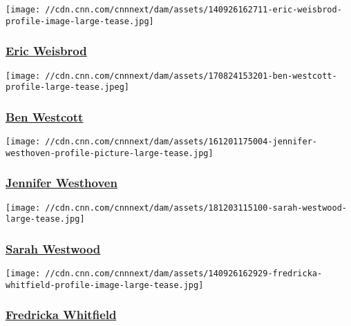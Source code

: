 \href{/profiles/eric-weisbrod-profile}{}

\texttt{[image: //cdn.cnn.com/cnnnext/dam/assets/140926162711-eric-weisbrod-profile-image-large-tease.jpg]}

\hypertarget{eric-weisbrod}{%
\subsubsection{\texorpdfstring{\href{/profiles/eric-weisbrod-profile}{Eric
Weisbrod}}{Eric Weisbrod}}\label{eric-weisbrod}}

\href{/profiles/ben-westcott}{}

\texttt{[image: //cdn.cnn.com/cnnnext/dam/assets/170824153201-ben-westcott-profile-large-tease.jpeg]}

\hypertarget{ben-westcott}{%
\subsubsection{\texorpdfstring{\href{/profiles/ben-westcott}{Ben
Westcott}}{Ben Westcott}}\label{ben-westcott}}

\href{/profiles/jennifer-westhoven}{}

\texttt{[image: //cdn.cnn.com/cnnnext/dam/assets/161201175004-jennifer-westhoven-profile-picture-large-tease.jpg]}

\hypertarget{jennifer-westhoven}{%
\subsubsection{\texorpdfstring{\href{/profiles/jennifer-westhoven}{Jennifer
Westhoven}}{Jennifer Westhoven}}\label{jennifer-westhoven}}

\href{/profiles/sarah-westwood}{}

\texttt{[image: //cdn.cnn.com/cnnnext/dam/assets/181203115100-sarah-westwood-large-tease.jpg]}

\hypertarget{sarah-westwood}{%
\subsubsection{\texorpdfstring{\href{/profiles/sarah-westwood}{Sarah
Westwood}}{Sarah Westwood}}\label{sarah-westwood}}

\href{/profiles/fredericka-whitfield-profile}{}

\texttt{[image: //cdn.cnn.com/cnnnext/dam/assets/140926162929-fredricka-whitfield-profile-image-large-tease.jpg]}

\hypertarget{fredricka-whitfield}{%
\subsubsection{\texorpdfstring{\href{/profiles/fredericka-whitfield-profile}{Fredricka
Whitfield}}{Fredricka Whitfield}}\label{fredricka-whitfield}}

